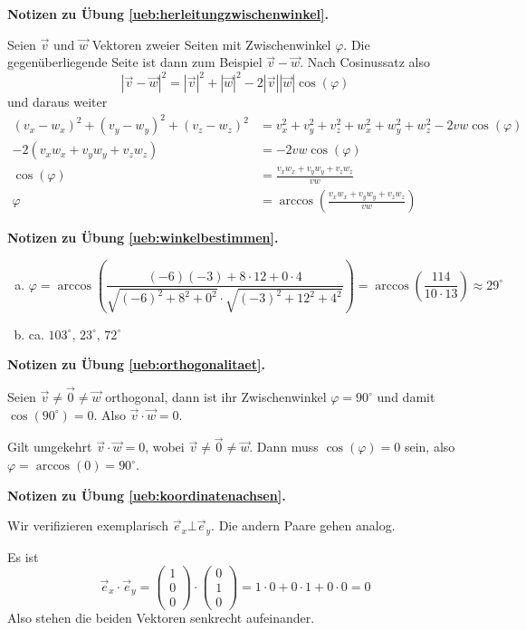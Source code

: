\documentclass[%
11pt,%
twoside,%
titlepage,%
german,%
headsepline%
]{scrartcl}
\theoremstyle{definition}
\theoremstyle{plain}
\newcommand{\concatueb}[1]{ueb:#1}%
\newcommand{\concatlsg}[1]{lsg:#1}%
\newenvironment{lsg}[1]{%
    \par\noindent\textbf{Notizen zu Übung \ref{\concatueb{#1}}.}%
    \label{\concatlsg{#1}}
}{%
    \par%
}
\begin{document}
\begin{lsg}{herleitungzwischenwinkel}
Seien $\vec{v}$ und $\vec{w}$ Vektoren zweier Seiten mit Zwischenwinkel $\varphi$. Die gegenüberliegende Seite ist dann zum Beispiel $\vec{v}-\vec{w}$. Nach Cosinussatz also
$$|\vec{v}-\vec{w}|^2=|\vec{v}|^2+|\vec{w}|^2-2|\vec{v}||\vec{w}|\cos(\varphi)$$
und daraus weiter
\begin{align*}
    (v_x-w_x)^2+(v_y-w_y)^2+(v_z-w_z)^2 &= v_x^2+v_y^2+v_z^2+w_x^2+w_y^2+w_z^2-2vw\cos(\varphi)\\
    -2(v_xw_x+v_yw_y+v_zw_z) &= -2vw\cos(\varphi)\\
    \cos(\varphi) &= \frac{v_xw_x+v_yw_y+v_zw_z}{vw}\\
    \varphi &= \arccos\left(\frac{v_xw_x+v_yw_y+v_zw_z}{vw}\right)
\end{align*}
\end{lsg}
\begin{lsg}{winkelbestimmen}
\begin{enumerate}[a)]
    \item $$\varphi=\arccos\left(\frac{(-6)(-3)+8\cdot12+0\cdot4}{\sqrt{(-6)^2+8^2+0^2}\cdot\sqrt{(-3)^2+12^2+4^2}}\right)=\arccos\left(\frac{114}{10\cdot13}\right)\approx29^\circ$$
    \item ca. $103^\circ$, $23^\circ$, $72^\circ$
\end{enumerate}
\end{lsg}
\begin{lsg}{orthogonalitaet}
    Seien $\vec{v}\neq\vec{0}\neq\vec{w}$ orthogonal, dann ist ihr Zwischenwinkel $\varphi=90^\circ$ und damit $\cos(90^\circ)=0$. Also $\vec{v}\cdot\vec{w}=0$.

    Gilt umgekehrt $\vec{v}\cdot\vec{w}=0$, wobei $\vec{v}\neq\vec{0}\neq\vec{w}$. Dann muss $\cos(\varphi)=0$ sein, also $\varphi=\arccos(0)=90^\circ$.
\end{lsg}
\begin{lsg}{koordinatenachsen}
Wir verifizieren exemplarisch $\vec{e}_x\bot\vec{e}_y$. Die andern Paare gehen analog.

Es ist
$$\vec{e}_x\cdot\vec{e}_y=\begin{pmatrix}
    1\\0\\0
\end{pmatrix}\cdot\begin{pmatrix}
    0\\1\\0
\end{pmatrix}=1\cdot0+0\cdot1+0\cdot0=0$$
Also stehen die beiden Vektoren senkrecht aufeinander.
\end{lsg}
\end{document}
